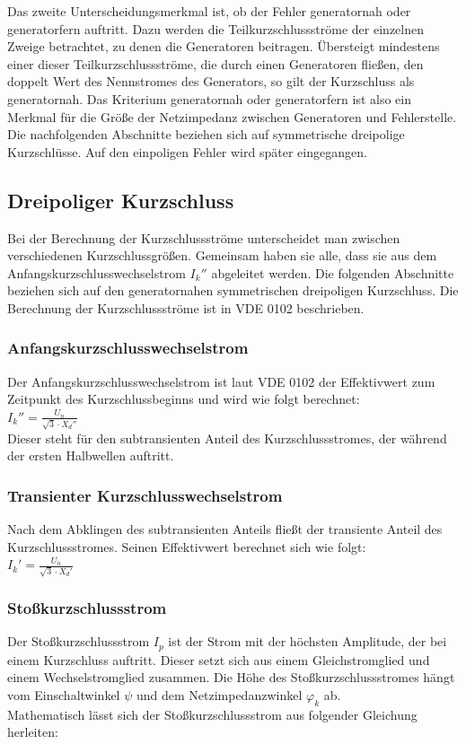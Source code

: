 \documentclass{scrartcl}
\begin{document}
\begin{onehalfspace}
Das zweite Unterscheidungsmerkmal ist, ob der Fehler \glqq generatornah\grqq{} oder \glqq generatorfern\grqq{} auftritt. Dazu werden die Teilkurzschlussströme der einzelnen Zweige betrachtet, zu denen die Generatoren beitragen. Übersteigt mindestens einer dieser Teilkurzschlussströme, die durch einen Generatoren fließen, den doppelt Wert des Nennstromes des Generators, so gilt der Kurzschluss als generatornah. Das Kriterium \glqq generatornah oder generatorfern\grqq{} ist also ein Merkmal für die Größe der Netzimpedanz zwischen Generatoren und Fehlerstelle. \\
Die nachfolgenden Abschnitte beziehen sich auf symmetrische dreipolige Kurzschlüsse. Auf den einpoligen Fehler wird später eingegangen.

\subsection{Dreipoliger Kurzschluss}
Bei der Berechnung der Kurzschlussströme unterscheidet man zwischen verschiedenen Kurzschlussgrößen. Gemeinsam haben sie alle, dass sie aus dem Anfangskurzschlusswechselstrom $I_k''$ abgeleitet werden. Die folgenden Abschnitte beziehen sich auf den generatornahen symmetrischen dreipoligen Kurzschluss. Die Berechnung der Kurzschlussströme ist in VDE 0102 beschrieben.

\subsubsection{Anfangskurzschlusswechselstrom}
Der Anfangskurzschlusswechselstrom ist laut VDE 0102 der \glqq Effektivwert zum Zeitpunkt des Kurzschlussbeginns\grqq{} und wird wie folgt berechnet: \\
$I_k'' = \frac{U_n}{\sqrt{3} \cdot X_d''} $ \\
Dieser steht für den subtransienten Anteil des Kurzschlussstromes, der während der ersten Halbwellen auftritt.

\subsubsection{Transienter Kurzschlusswechselstrom}
Nach dem Abklingen des subtransienten Anteils fließt der transiente Anteil des Kurzschlussstromes. Seinen Effektivwert berechnet sich wie folgt: \\
$I_k' = \frac{U_n}{\sqrt{3} \cdot X_d'}$

\subsubsection{Stoßkurzschlussstrom}
Der Stoßkurzschlussstrom $I_p$ ist der Strom mit der höchsten Amplitude, der bei einem Kurzschluss auftritt. Dieser setzt sich aus einem Gleichstromglied und einem Wechselstromglied zusammen. Die Höhe des Stoßkurzschlussstromes hängt vom Einschaltwinkel $\psi$ und dem Netzimpedanzwinkel $\varphi_k$ ab. \\
Mathematisch lässt sich der Stoßkurzschlussstrom aus folgender Gleichung herleiten: \\


\end{onehalfspace}
\end{document}
